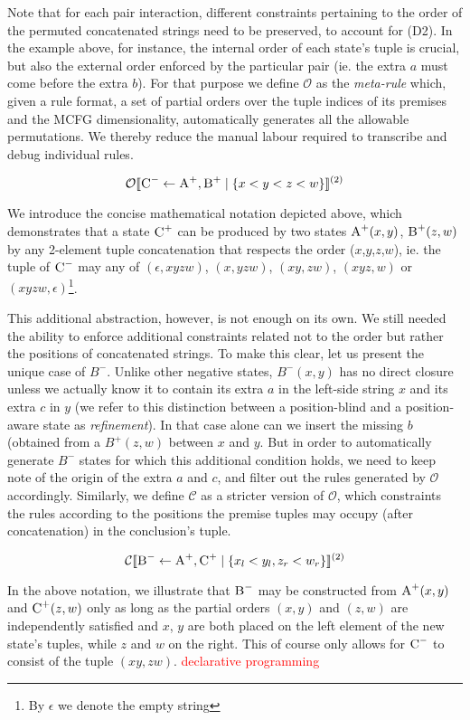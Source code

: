 \documentclass[nonatbib,numbers,10pt]{sigplanconf}
\newcommand\todo[1]{\textcolor{red}{#1}}
\newcommand{\Order}[5]{
	\[
	\mathcal{#1}\llbracket #2 \leftarrow #3 \mid \{ #4 \} \rrbracket^{(#5)}
	\]
}
\newcommand{\Ord}[4]{\Order{O}{#1}{#2}{#3}{#4}}
\newcommand{\Con}[4]{\Order{C}{#1}{#2}{#3}{#4}}
\begin{document}
Note that for each pair interaction, different constraints pertaining to the order of the permuted concatenated strings need to be preserved, to account for (D2). In the example above, for instance, the internal order of each state's tuple is crucial, but also the external order enforced by the particular pair (ie. the extra $a$ must come before the extra $b$). For that purpose we define $\mathcal{O}$ as the \textit{meta-rule} which, given a rule format, a set of partial orders over the tuple indices of its premises and the MCFG dimensionality, automatically generates all the allowable permutations. We thereby reduce the manual labour required to transcribe and debug individual rules.

\Ord{\textsc{C}^-}{\textsc{A}^+, \textsc{B}^+}{x < y < z < w}{2}

We introduce the concise mathematical notation depicted above, which demonstrates that a state $\textsc{C}^{+}$ can be produced by two states $\textsc{A}^{+}(x,y)$, $\textsc{B}^{+}(z,w)$ by any 2-element tuple concatenation that respects the order ($x$,$y$,$z$,$w$), ie. the tuple of $\textsc{C}^{-}$ may any of $(\epsilon, xyzw)$, $(x, yzw)$, $(xy,zw)$, $(xyz,w)$ or $(xyzw, \epsilon)$\footnote{By $\epsilon$ we denote the empty string}.

This additional abstraction, however, is not enough on its own. We still needed the ability to enforce additional constraints related not to the order but rather the positions of concatenated strings. To make this clear, let us present the unique case of $B^{-}$. Unlike other negative states, $B^{-}(x,y)$ has no direct closure unless we actually know it to contain its extra $a$ in the left-side string $x$ and its extra $c$ in $y$ (we refer to this distinction between a position-blind and a position-aware state as \textit{refinement}). In that case alone can we insert the missing $b$ (obtained from a $B^{+}(z,w)$ between $x$ and $y$. But in order to automatically generate $B^{-}$ states for which this additional condition holds, we need to keep note of the origin of the extra $a$ and $c$, and filter out the rules generated by $\mathcal{O}$ accordingly. Similarly, we define $\mathcal{C}$ as a stricter version of $\mathcal{O}$, which constraints the rules according to the positions the premise tuples may occupy (after concatenation) in the conclusion's tuple.

\Con{\textsc{B}^-}{\textsc{A}^+, \textsc{C}^+}{x_l < y_l, z_r < w_r}{2}

In the above notation, we illustrate that $\textsc{B}^{-}$ may be constructed from $\textsc{A}^{+}(x,y)$ and $\textsc{C}^{+}(z,w)$ only as long as the partial orders $(x,y)$ and $(z,w)$ are independently satisfied and $x$, $y$ are both placed on the left element of the new state's tuples, while $z$ and $w$ on the right. This of course only allows for $\textsc{C}^{-}$ to consist of the tuple $(xy, zw)$.
\todo{declarative programming}
\end{document}
